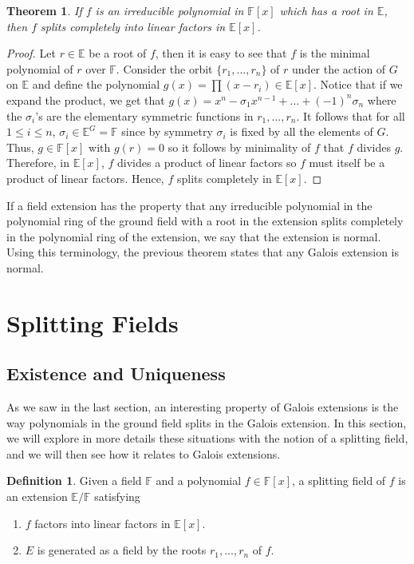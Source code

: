 \documentclass{article}
\theoremstyle{plain}
\newtheorem{theorem}{Theorem}[subsection]
\theoremstyle{definition}
\newtheorem*{definition}{Definition}
\newcommand{\F}{\mathbb{F}}
\newcommand{\E}{\mathbb{E}}
\begin{document}
\begin{theorem}
\label{galois implies normal}
    If $f$ is an irreducible polynomial in $\F[x]$ which has a root in $\E$, then $f$ splits completely into linear factors in $\E[x]$. 
\end{theorem}

\begin{proof}
    Let $r \in \E$ be a root of $f$, then it is easy to see that $f$ is the minimal polynomial of $r$ over $\F$. Consider the orbit $\{r_1, ..., r_n\}$ of $r$ under the action of $G$ on $\E$ and define the polynomial $g(x) = \prod(x - r_i) \in \E[x]$. Notice that if we expand the product, we get that $g(x) = x^n - \sigma_1 x^{n - 1} + ... + (-1)^n \sigma_n$ where the $\sigma_i$'s are the elementary symmetric functions in $r_1, ..., r_n$. It follows that for all $1 \leq i \leq n$, $\sigma_i \in \E^G = \F$ since by symmetry $\sigma_i$ is fixed by all the elements of $G$. Thus, $g \in \F[x]$ with $g(r) = 0$ so it follows by minimality of $f$ that $f$ divides $g$. Therefore, in $\E[x]$, $f$ divides a product of linear factors so $f$ must itself be a product of linear factors. Hence, $f$ splits completely in $\E[x]$. 
\end{proof}

If a field extension has the property that any irreducible polynomial in the polynomial ring of the ground field with a root in the extension splits completely in the polynomial ring of the extension, we say that the extension is normal. Using this terminology, the previous theorem states that any Galois extension is normal.

\section{Splitting Fields} \label{splitting_fields}

\subsection{Existence and Uniqueness}

As we saw in the last section, an interesting property of Galois extensions is the way polynomials in the ground field splits in the Galois extension. In this section, we will explore in more details these situations with the notion of a splitting field, and we will then see how it relates to Galois extensions.

\begin{definition}
    Given a field $\F$ and a polynomial $f \in \F[x]$, a splitting field of $f$ is an extension $\E / \F$ satisfying
    \begin{enumerate}[label=(\alph*)]
        \item $f$ factors into linear factors in $\E[x]$.
        \item $E$ is generated as a field by the roots $r_1, ..., r_n$ of $f$.
    \end{enumerate}
\end{definition}
\end{document}
